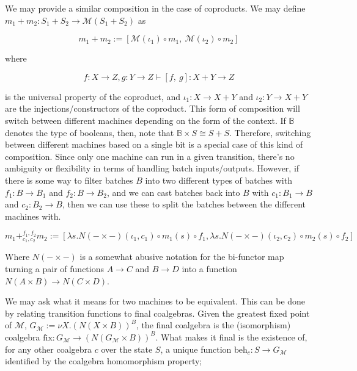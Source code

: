 We may provide a similar composition in the case of coproducts. We may define $m_1 + m_2 : S_1 + S_2 \to \mathcal{M}(S_1 + S_2)$ as

\begin{equation}
    m_1 + m_2 := [\mathcal{M}(\iota_1) \circ m_1,\ \mathcal{M}(\iota_2) \circ m_2]
\end{equation}

where

\begin{equation}
    f : X \rightarrow Z, g : Y \rightarrow Z \vdash [f,\ g] : X + Y \rightarrow Z
\end{equation}

is the universal property of the coproduct, and $\iota_1 : X \rightarrow X + Y$ and $\iota_2 : Y \rightarrow X + Y$ are the injections/constructors of the coproduct. This form of composition will switch between different machines depending on the form of the context. If $\mathbb{B}$ denotes the type of booleans, then, note that $\mathbb{B} \times S \cong S + S$. Therefore, switching between different machines based on a single bit is a special case of this kind of composition. Since only one machine can run in a given transition, there's no ambiguity or flexibility in terms of handling batch inputs/outputs. However, if there is some way to filter batches $B$ into two different types of batches with $f_1 : B \rightarrow B_1$ and $f_2 : B \rightarrow B_2$, and we can cast batches back into $B$ with $c_1 : B_1 \rightarrow B$ and $c_2 : B_2 \rightarrow B$, then we can use these to split the batches between the different machines with.

\begin{equation}
    m_1 +^{f_1, f_2}_{c_1, c_2} m_2 := [\lambda s. N(- \times -)(\iota_1, c_1) \circ m_1(s) \circ f_1
    , \lambda s. N(- \times -)(\iota_2, c_2) \circ m_2(s) \circ f_2]
\end{equation}

Where $N(- \times -)$ is a somewhat abusive notation for the bi-functor map turning a pair of functions $A \rightarrow C$ and $B \rightarrow D$ into a function $N(A \times B) \rightarrow N(C \times D)$.

We may ask what it means for two machines to be equivalent. This can be done by relating transition functions to final coalgebras. Given the greatest fixed point of $\mathcal{M}$, $G_\mathcal{M} := \nu X. (N(X \times B))^B$, the final coalgebra is the (isomorphism) coalgebra $\text{fix} : G_\mathcal{M} \rightarrow (N(G_\mathcal{M} \times B))^B$. What makes it final is the existence of, for any other coalgebra $c$ over the state $S$, a unique function $\text{beh}_c : S \rightarrow G_\mathcal{M}$ identified by the coalgebra homomorphism property;

